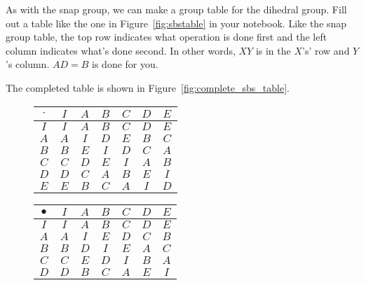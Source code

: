 \documentclass[../key.tex]{subfiles}
\begin{document}
\begin{outer_problem}
\item As with the snap group, we can make a group table for the dihedral group. Fill out a table like the one in Figure~\ref{fig:sbstable} in your notebook. Like the snap group table, the top row indicates what operation is done first and the left column indicates what's done second. In other words, $XY$ is in the $X$'s' row and $Y$'s column. $AD=B$ is done for you.
\end{outer_problem}

\noindent The completed table is shown in Figure~\ref{fig:complete_sbs_table}.

\begin{figure}[h]
	\begin{center}
		\begin{minipage}[b]{0.45\textwidth}
			\centering
			\begin{tabular}{c|cccccc}
				\hline
				$\cdot$ & $I$ & $A$ & $B$ & $C$ & $D$ & $E$ \\ \hline
				\rowcolor{light-gray}
				$I$ & $I$ & $A$ & $B$ & $C$ & $D$ & $E$ \\
				$A$ & $A$ & $I$ & $D$ & $E$ & $B$ & $C$ \\
				\rowcolor{light-gray}
				$B$ & $B$ & $E$ & $I$ & $D$ & $C$ & $A$ \\
				$C$ & $C$ & $D$ & $E$ & $I$ & $A$ & $B$ \\
				\rowcolor{light-gray}
				$D$ & $D$ & $C$ & $A$ & $B$ & $E$ & $I$ \\
				$E$ & $E$ & $B$ & $C$ & $A$ & $I$ & $D$ \\ \hline
			\end{tabular}
			\vspace*{0.5\baselineskip}
		\end{minipage}
		\hfill
		\begin{minipage}[b]{0.45\textwidth}
			\centering
			\begin{tabular}{c|cccccc}
				\hline
				$\bullet$ & $I$ & $A$ & $B$ & $C$ & $D$ & $E$ \\ \hline
				\rowcolor{light-gray}
				$I$ & $I$ & $A$ & $B$ & $C$ & $D$ & $E$ \\
				$A$ & $A$ & $I$ & $E$ & $D$ & $C$ & $B$ \\
				\rowcolor{light-gray}
				$B$ & $B$ & $D$ & $I$ & $E$ & $A$ & $C$ \\
				$C$ & $C$ & $E$ & $D$ & $I$ & $B$ & $A$ \\
				\rowcolor{light-gray}
				$D$ & $D$ & $B$ & $C$ & $A$ & $E$ & $I$ \\

\end{tabular}
\end{minipage}
\end{center}
\end{figure}
\end{document}
